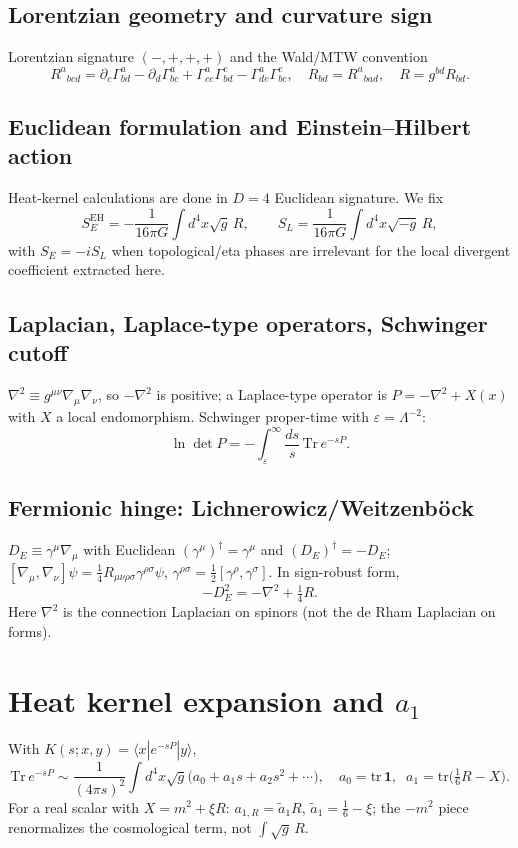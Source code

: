 \documentclass[11pt,a4paper]{article}
\begin{document}
\subsection{Lorentzian geometry and curvature sign}
Lorentzian signature $(-,+,+,+)$ and the Wald/MTW convention
\[
R^a{}_{bcd} = \partial_c\Gamma^a_{bd} - \partial_d\Gamma^a_{bc}
+ \Gamma^a_{ce}\Gamma^e_{bd} - \Gamma^a_{de}\Gamma^e_{bc},
\quad R_{bd} = R^a{}_{bad}, \quad R = g^{bd}R_{bd}.
\]

\subsection{Euclidean formulation and Einstein--Hilbert action}
Heat-kernel calculations are done in $D=4$ Euclidean signature. We fix
\[
S_E^{\mathrm{EH}} = -\frac{1}{16\pi G}\int d^4x\sqrt{g}\,R,
\qquad
S_L = \frac{1}{16\pi G}\int d^4x\sqrt{-g}\,R,
\]
with $S_E = -iS_L$ when topological/eta phases are irrelevant for the local
divergent coefficient extracted here.

\subsection{Laplacian, Laplace-type operators, Schwinger cutoff}
$\nabla^2 \equiv g^{\mu\nu}\nabla_\mu\nabla_\nu$, so $-\nabla^2$ is positive; a
Laplace-type operator is $P = -\nabla^2 + X(x)$ with $X$ a local endomorphism.
Schwinger proper-time with $\varepsilon = \Lambda^{-2}$:
\[
\ln\det P = -\int_\varepsilon^\infty \frac{ds}{s}\,\mathrm{Tr}\,e^{-sP}.
\]

\subsection{Fermionic hinge: Lichnerowicz/Weitzenb\"ock}
$D_E \equiv \gamma^\mu\nabla_\mu$ with Euclidean $(\gamma^\mu)^\dagger =
\gamma^\mu$ and $(D_E)^\dagger = -D_E$;
$[\nabla_\mu,\nabla_\nu]\psi = \tfrac14 R_{\mu\nu\rho\sigma}\gamma^{\rho\sigma}
\psi$, $\gamma^{\rho\sigma} = \tfrac12[\gamma^\rho,\gamma^\sigma]$. In
sign-robust form,
\[
-D_E^2 = -\nabla^2 + \tfrac14 R.
\]
Here $\nabla^2$ is the connection Laplacian on spinors (not the de Rham
Laplacian on forms).

\section{Heat kernel expansion and $a_1$}
With $K(s;x,y) = \langle x|e^{-sP}|y\rangle$,
\[
\mathrm{Tr}\,e^{-sP} \sim \frac{1}{(4\pi s)^2}\int d^4x\sqrt{g}
\big(a_0 + a_1 s + a_2 s^2 + \cdots\big),
\quad
a_0 = \mathrm{tr}\,\mathbf{1},\;\;
a_1 = \mathrm{tr}\big(\tfrac16 R - X\big).
\]
For a real scalar with $X = m^2 + \xi R$: $a_{1,R} = \tilde a_1 R$,
$\tilde a_1 = \tfrac16 - \xi$; the $-m^2$ piece renormalizes the cosmological
term, not $\int\sqrt{g}\,R$.
\end{document}
